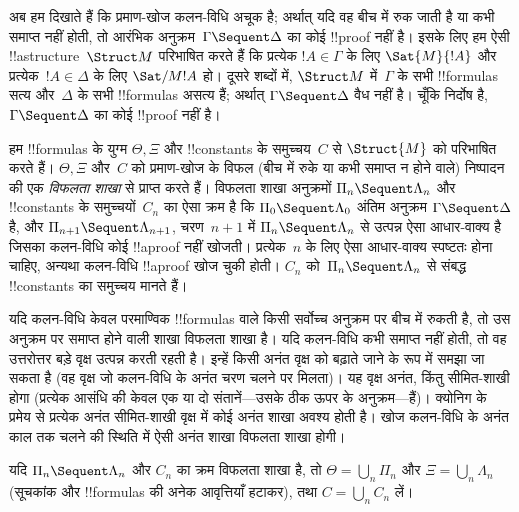 \documentclass[../../../include/open-logic-section]{subfiles}
\begin{document}


अब हम दिखाते हैं कि प्रमाण-खोज कलन-विधि अचूक है; अर्थात् यदि वह बीच में रुक
जाती है या कभी समाप्त नहीं होती, तो आरंभिक अनुक्रम~$\Gamma \Sequent \Delta$
का कोई !!{proof} नहीं है। इसके लिए हम ऐसी !!a{structure}~$\Struct M$
परिभाषित करते हैं कि प्रत्येक $!A \in \Gamma$ के लिए $\Sat{M}{!A}$ और
प्रत्येक~$!A \in \Delta$ के लिए $\Sat/{M}{!A}$ हो। दूसरे शब्दों में,
$\Struct M$ में~$\Gamma$ के सभी !!{formula}s सत्य और~$\Delta$ के सभी
!!{formula}s असत्य हैं; अर्थात् $\Gamma \Sequent \Delta$ वैध नहीं है। चूँकि
 निर्दोष है, $\Gamma \Sequent \Delta$ का कोई !!{proof} नहीं है।

हम !!{formula}s के युग्म $\Theta, \Xi$ और !!{constant}s के समुच्चय~$C$ से
$\Struct{M}$ को परिभाषित करते हैं। $\Theta, \Xi$ और~$C$ को प्रमाण-खोज के
विफल (बीच में रुके या कभी समाप्त न होने वाले) निष्पादन की एक \emph{विफलता
शाखा} से प्राप्त करते हैं। विफलता शाखा अनुक्रमों $\Pi_n \Sequent \Lambda_n$
और !!{constant}s के समुच्चयों~$C_n$ का ऐसा क्रम है कि $\Pi_0 \Sequent
\Lambda_0$ अंतिम अनुक्रम $\Gamma \Sequent \Delta$ है, और $\Pi_{n+1}
\Sequent \Lambda_{n+1}$, चरण~$n+1$ में $\Pi_n \Sequent \Lambda_n$ से उत्पन्न
ऐसा आधार-वाक्य है जिसका कलन-विधि कोई !!a{proof} नहीं खोजती। प्रत्येक~$n$ के
लिए ऐसा आधार-वाक्य स्पष्टतः होना चाहिए, अन्यथा कलन-विधि !!a{proof} खोज चुकी
होती। $C_n$ को~$\Pi_n \Sequent \Lambda_n$ से संबद्ध !!{constant}s का समुच्चय
मानते हैं।

यदि कलन-विधि केवल परमाण्विक !!{formula}s वाले किसी सर्वोच्च अनुक्रम पर बीच में
रुकती है, तो उस अनुक्रम पर समाप्त होने वाली शाखा विफलता शाखा है। यदि
कलन-विधि कभी समाप्त नहीं होती, तो वह उत्तरोत्तर बड़े वृक्ष उत्पन्न करती रहती
है। इन्हें किसी अनंत वृक्ष को बढ़ाते जाने के रूप में समझा जा सकता है (वह वृक्ष
जो कलन-विधि के अनंत चरण चलने पर मिलता)। यह वृक्ष अनंत, किंतु सीमित-शाखी होगा
(प्रत्येक आसंधि की केवल एक या दो संतानें—उसके ठीक ऊपर के अनुक्रम—हैं)। क्योनिग
के प्रमेय से प्रत्येक अनंत सीमित-शाखी वृक्ष में कोई अनंत शाखा अवश्य होती है।
खोज कलन-विधि के अनंत काल तक चलने की स्थिति में ऐसी अनंत शाखा विफलता शाखा
होगी।

यदि $\Pi_n \Sequent \Lambda_n$ और $C_n$ का क्रम विफलता शाखा है, तो $\Theta
= \bigcup_n \Pi_n$ और $\Xi = \bigcup_n \Lambda_n$ (सूचकांक और !!{formula}s
की अनेक आवृत्तियाँ हटाकर), तथा $C = \bigcup_n C_n$ लें।
\end{document}

